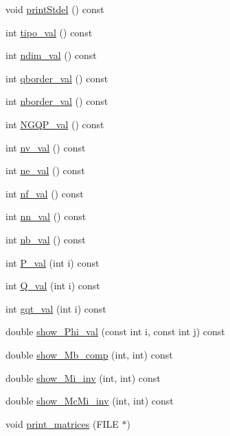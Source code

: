 \begin{DoxyCompactItemize}
\item 
void \hyperlink{classStdel_a54b5768d09f500cb949e66fc234eac70}{print\+Stdel} () const
\item 
int \hyperlink{classStdel_a75023fc369db2752845a9ce278f10929}{tipo\+\_\+val} () const
\item 
int \hyperlink{classStdel_a383df930bee8dc298d7d412b3b632ebb}{ndim\+\_\+val} () const
\item 
int \hyperlink{classStdel_a457d20e34fb7a32eb1e4aca6c19f53a2}{qborder\+\_\+val} () const
\item 
int \hyperlink{classStdel_aac8e97661e46c48fafa91f13caa03a9f}{nborder\+\_\+val} () const
\item 
int \hyperlink{classStdel_a2f964819235e0a55fd60733518b592f2}{N\+G\+Q\+P\+\_\+val} () const
\item 
int \hyperlink{classStdel_ae2ab461d1bc8d9f6006665fe03684845}{nv\+\_\+val} () const
\item 
int \hyperlink{classStdel_aa45f211663f5e8e47fdea32232ff23ea}{ne\+\_\+val} () const
\item 
int \hyperlink{classStdel_a2eed3ce0b73050e868989be78d918e5c}{nf\+\_\+val} () const
\item 
int \hyperlink{classStdel_a6086dceed8fe3dd410da0d6b84f02377}{nn\+\_\+val} () const
\item 
int \hyperlink{classStdel_a4fb0a049dc27d8e67665a56d1b5a18ba}{nb\+\_\+val} () const
\item 
int \hyperlink{classStdel_a701c7d5595d4f6632333c4202898983b}{P\+\_\+val} (int i) const
\item 
int \hyperlink{classStdel_aeea4659f5bcabbf1acb374180c43a293}{Q\+\_\+val} (int i) const
\item 
int \hyperlink{classStdel_a0775d0c4f7f15ae26bd45fc949e6f6b9}{gqt\+\_\+val} (int i) const
\item 
double \hyperlink{classStdel_a6565c36150823a1f52a2daf05806f7a4}{show\+\_\+\+Phi\+\_\+val} (const int i, const int j) const
\item 
double \hyperlink{classStdel_a4860f0f650640f859c5f75c206ee1f60}{show\+\_\+\+Mb\+\_\+comp} (int, int) const
\item 
double \hyperlink{classStdel_a11bf2897170ada9a9dd8f641a39585e5}{show\+\_\+\+Mi\+\_\+inv} (int, int) const
\item 
double \hyperlink{classStdel_a44d5aa234e02fb41afd5a4e5e45fadc4}{show\+\_\+\+Mc\+Mi\+\_\+inv} (int, int) const
\item 
void \hyperlink{classStdel_a319e6a16011b22e12028a841b7686f03}{print\+\_\+matrices} (F\+I\+LE $\ast$)

\end{DoxyCompactItemize}
